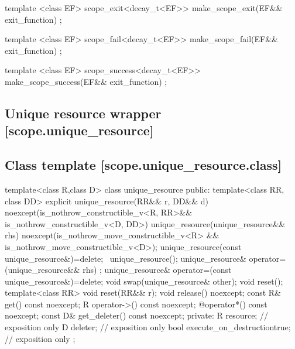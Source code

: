 \documentclass[ebook,11pt,article]{memoir}
\begin{document}
\begin{itemdecl}
template <class EF>
scope_exit<decay_t<EF>> make_scope_exit(EF&& exit_function) ;
\end{itemdecl}

\begin{itemdescr}
\pnum
\returns {}
\end{itemdescr}

\begin{itemdecl}
template <class EF>
scope_fail<decay_t<EF>> make_scope_fail(EF&& exit_function) ;
\end{itemdecl}

\begin{itemdescr}
\pnum
\pnum
\returns {}
\end{itemdescr}

\begin{itemdecl}
template <class EF>
scope_success<decay_t<EF>> make_scope_success(EF&& exit_function) ;
\end{itemdecl}

\begin{itemdescr}
\pnum
\pnum
\returns {}

\end{itemdescr}


\newpage

\subsection{Unique resource wrapper [scope.unique_resource]}

\subsection {Class template  [scope.unique_resource.class]}

\begin{codeblock}
template<class R,class D>
class unique_resource {
public:
  template<class RR, class DD>
  explicit unique_resource(RR&& r, DD&& d)
    noexcept(is_nothrow_constructible_v<R, RR>&&
             is_nothrow_constructible_v<D, DD>)
  unique_resource(unique_resource&& rhs)
    noexcept(is_nothrow_move_constructible_v<R> &&
             is_nothrow_move_constructible_v<D>);
  unique_resource(const unique_resource&)=delete; 
  ~unique_resource();
  unique_resource& operator=(unique_resource&& rhs) ;
  unique_resource& operator=(const unique_resource&)=delete;
  void swap(unique_resource& other);
  void reset();
  template<class RR>
  void reset(RR&& r);
  void release() noexcept;
  const R& get() const noexcept;
  R operator->() const noexcept;
  @\seebelow@ operator*() const noexcept;
  const D& get_deleter() const noexcept;
private:
  R resource; // exposition only
  D deleter; // exposition only
  bool execute_on_destruction{true}; // exposition only
};
\end{codeblock}
\end{document}
